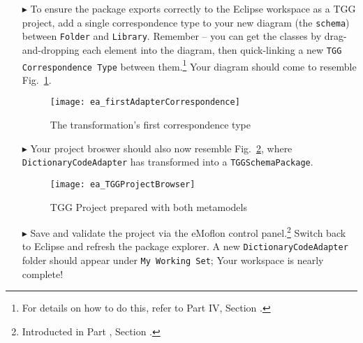 \begin{itemize}

\item[$\blacktriangleright$] To ensure the package exports correctly to the Eclipse workspace as a TGG project, add a single correspondence type to your new
diagram (the \texttt{schema}) between \texttt{Folder} and \texttt{Library}. Remember -- you can get the classes by drag-and-dropping each element into the
diagram, then quick-linking a new \texttt{TGG Correspondence Type} between them.\footnote{For details on how to do this, refer to Part IV, Section \update.}
Your diagram should come to resemble Fig.~\ref{ea:firstCorrType}.

\vspace{0.5cm}

\begin{figure}[htpb]
\begin{center}
  \texttt{[image: ea\_firstAdapterCorrespondence]}
  \caption{The transformation's first correspondence type}
  \label{ea:firstCorrType}
\end{center}
\end{figure}

\vspace{0.5cm}
\item[$\blacktriangleright$] Your project broswer should also now resemble Fig.~\ref{ea:TGGProjBrow}, where \texttt{Dict\-ion\-ary\-Code\-Adap\-ter} has
transformed into a \texttt{TGGSchemaPackage}.

\begin{figure}[htpb]
\begin{center}
  \texttt{[image: ea\_TGGProjectBrowser]}
  \caption{TGG Project prepared with both metamodels}
  \label{ea:TGGProjBrow}
\end{center}
\end{figure}

\item[$\blacktriangleright$] Save and validate the project via the eMoflon control panel.\footnote{Introducted in Part \update, Section \update.} Switch back
to Eclipse and refresh the package explorer. A new \texttt{Dict\-ion\-ary\-Code\-Adap\-ter} folder should appear under \texttt{My Working Set}; Your workspace
is nearly complete!


\end{itemize}
